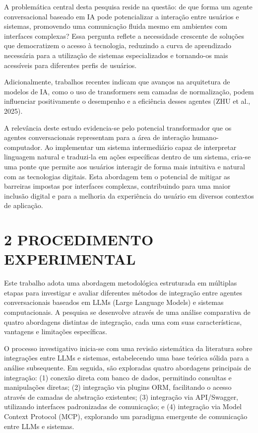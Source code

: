 \documentclass[
]{article}
\begin{document}
A problemática central desta pesquisa reside na questão: de que forma um
agente conversacional baseado em IA pode potencializar a interação entre
usuários e sistemas, promovendo uma comunicação fluida mesmo em
ambientes com interfaces complexas? Essa pergunta reflete a necessidade
crescente de soluções que democratizem o acesso à tecnologia, reduzindo
a curva de aprendizado necessária para a utilização de sistemas
especializados e tornando-os mais acessíveis para diferentes perfis de
usuários.

Adicionalmente, trabalhos recentes indicam que avanços na arquitetura de
modelos de IA, como o uso de transformers sem camadas de normalização,
podem influenciar positivamente o desempenho e a eficiência desses
agentes (ZHU et al., 2025).

A relevância deste estudo evidencia-se pelo potencial transformador que
os agentes conversacionais representam para a área de interação
humano-computador. Ao implementar um sistema intermediário capaz de
interpretar linguagem natural e traduzi-la em ações específicas dentro
de um sistema, cria-se uma ponte que permite aos usuários interagir de
forma mais intuitiva e natural com as tecnologias digitais. Esta
abordagem tem o potencial de mitigar as barreiras impostas por
interfaces complexas, contribuindo para uma maior inclusão digital e
para a melhoria da experiência do usuário em diversos contextos de
aplicação.

\section{2 PROCEDIMENTO EXPERIMENTAL}\label{procedimento-experimental}

Este trabalho adota uma abordagem metodológica estruturada em múltiplas
etapas para investigar e avaliar diferentes métodos de integração entre
agentes conversacionais baseados em LLMs (Large Language Models) e
sistemas computacionais. A pesquisa se desenvolve através de uma análise
comparativa de quatro abordagens distintas de integração, cada uma com
suas características, vantagens e limitações específicas.

O processo investigativo inicia-se com uma revisão sistemática da
literatura sobre integrações entre LLMs e sistemas, estabelecendo uma
base teórica sólida para a análise subsequente. Em seguida, são
exploradas quatro abordagens principais de integração: (1) conexão
direta com banco de dados, permitindo consultas e manipulações diretas;
(2) integração via plugins ORM, facilitando o acesso através de camadas
de abstração existentes; (3) integração via API/Swagger, utilizando
interfaces padronizadas de comunicação; e (4) integração via Model
Context Protocol (MCP), explorando um paradigma emergente de comunicação
entre LLMs e sistemas.
\end{document}
